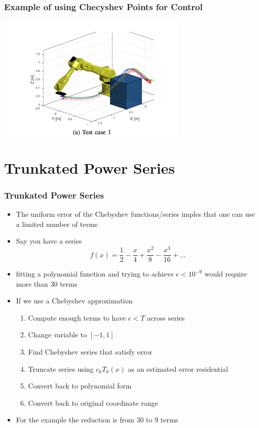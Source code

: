\documentclass[10pt]{beamer}
\begin{document}
\begin{frame}
  \frametitle{Example of using Checyshev Points for Control}
  \centerline{\includegraphics[height=6cm]{Chebyshev-points}}
\end{frame}

\section{Trunkated Power Series}

\begin{frame}
  \frametitle{Trunkated Power Series}
  \begin{itemize}
  \item The uniform error of the Chebyshev functions/series imples
    that one can use a limited number of terms
  \item Say you have a series
    \[
      f(x) = \frac{1}{2} - \frac{x}{4} + \frac{x^2}{8} - \frac{x^3}{16} + \ldots
    \]
  \item fitting a polynomial function and trying to achieve
    $\epsilon < 10^{-9}$ would require more than 30 terms
  \item If we use a Chebyshev approximation
    \begin{enumerate}
    \item Compute enough terms to have $\epsilon < T$ across series
    \item Change variable to $[-1,1]$
    \item Find Chebyshev series that satisfy error
    \item Truncate series using $c_kT_k(x)$ as an estimated error residential
    \item Convert back to polynomial form
    \item Convert back to original coordinate range
    \end{enumerate}
  \item For the example the reduction is from 30 to 9 terms
  \end{itemize}
\end{frame}
\end{document}
